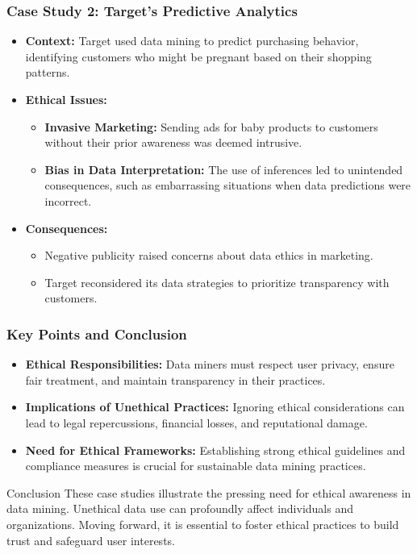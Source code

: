 \documentclass[aspectratio=169]{beamer}
\begin{document}
\begin{frame}[fragile]
  \frametitle{Case Study 2: Target’s Predictive Analytics}
  \begin{itemize}
    \item \textbf{Context:} Target used data mining to predict purchasing behavior, identifying customers who might be pregnant based on their shopping patterns.
    \item \textbf{Ethical Issues:}
      \begin{itemize}
        \item \textbf{Invasive Marketing:} Sending ads for baby products to customers without their prior awareness was deemed intrusive.
        \item \textbf{Bias in Data Interpretation:} The use of inferences led to unintended consequences, such as embarrassing situations when data predictions were incorrect.
      \end{itemize}
    \item \textbf{Consequences:}
      \begin{itemize}
        \item Negative publicity raised concerns about data ethics in marketing.
        \item Target reconsidered its data strategies to prioritize transparency with customers.
      \end{itemize}
  \end{itemize}
\end{frame}

\begin{frame}[fragile]
  \frametitle{Key Points and Conclusion}
  \begin{itemize}
    \item \textbf{Ethical Responsibilities:} Data miners must respect user privacy, ensure fair treatment, and maintain transparency in their practices.
    \item \textbf{Implications of Unethical Practices:} Ignoring ethical considerations can lead to legal repercussions, financial losses, and reputational damage.
    \item \textbf{Need for Ethical Frameworks:} Establishing strong ethical guidelines and compliance measures is crucial for sustainable data mining practices.
  \end{itemize}
  \begin{block}{Conclusion}
    These case studies illustrate the pressing need for ethical awareness in data mining. Unethical data use can profoundly affect individuals and organizations. Moving forward, it is essential to foster ethical practices to build trust and safeguard user interests.
  \end{block}
\end{frame}
\end{document}
